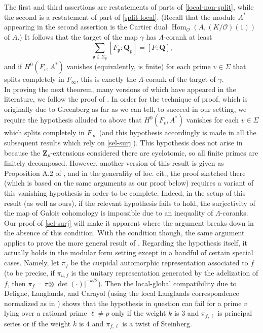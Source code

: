 \documentclass[12 pt]{amsart}
\theoremstyle{plain}
\theoremstyle{definition}
\numberwithin{equation}{section}
\numberwithin{table}{section}
\begin{document}
The first and third assertions are restatements of parts of \cref{local-non-split}, while the second is a restatement of part of \cref{split-local}. (Recall that the module $A^*$ appearing in the second assertion is the Cartier dual $\operatorname{Hom}_\mathscr{O}(A,(K/\mathscr{O})(1))$ of $A$.) It follows that the target of the map $\gamma$ has $\Lambda$-corank at least
\begin{equation*}
\sum_{\mathfrak{p}\in\Sigma_p}[F_\mathfrak{p}:\mathbf{Q}_p]=[F:\mathbf{Q}]\text{,}
\end{equation*}
and if $H^0(F_v,A^*)$ vanishes (equivalently, is finite) for each prime $v\in\Sigma$ that splits completely in $F_\infty$, this is exactly the $\Lambda$-corank of the target of $\gamma$.\\%
\indent In proving the next theorem, many versions of which have appeared in the literature, we follow the proof of \cite[Proposition 1.8]{W}. In order for the technique of proof, which is originally due to Greenberg as far as we can tell, to succeed in our setting, we require the hypothesis alluded to above that $H^0(F_v,A^*)$ vanishes for each $v\in\Sigma$ which splits completely in $F_\infty$ (and this hypothesis accordingly is made in all the subsequent results which rely on \cref{sel-surj}). This hypothesis does not arise in \cite{W} because the $\mathbf{Z}_p$-extensions considered there are cyclotomic, so all finite primes are finitely decomposed. However, another version of this result is given as Proposition A.2 of \cite{PW11}, and in the generality of loc. cit., the proof sketched there (which is based on the same arguments as our proof below) requires a variant of this vanishing hypothesis in order to be complete. Indeed, in the setup of this result (as well as ours), if the relevant hypothesis fails to hold, the surjectivity of the map of Galois cohomology is impossible due to an inequality of $\Lambda$-coranks. Our proof of \cref{sel-surj} will make it apparent where the argument breaks down in the absence of this condition. With the condition though, the same argument applies to prove the more general result of \cite{PW11}. Regarding the hypothesis itself, it actually holds in the modular form setting except in a handful of certain special cases. Namely, let $\pi_f$ be the cuspidal automorphic representation associated to $f$ (to be precise, if $\pi_{u,f}$ is the unitary representation generated by the adelization of $f$, then $\pi_f=\pi\otimes\vert\det(\cdot)\vert^{-k/2}$). Then the local-global compatibility due to Deligne, Langlands, and Carayol (using the local Langlands correspondence normalized as in \cite[\S 0.5]{Car83}) shows that the hypothesis in question can fail for a prime $v$ lying over a rational prime $\ell\neq p$ only if the weight $k$ is $3$ and $\pi_{f,\ell}$ is principal series or if the weight $k$ is $4$ and $\pi_{f,\ell}$ is a twist of Steinberg. \\ 
\end{document}
